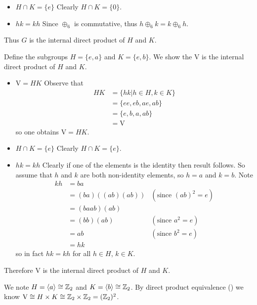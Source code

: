 \begin{questions}
\begin{itemize}
        \item $\boxed{H \cap K = \{e\}}$ Clearly $H \cap K = \{0\}$.

        \item $\boxed{hk = kh}$ Since $\oplus_6$ is commutative, thus $h \oplus_6 k = k \oplus_6 h$.
    \end{itemize}
    Thus $G$ is the internal direct product of $H$ and $K$.

    \item Define the subgroups $H = \{e, a\}$ and $K = \{e, b\}$. We show the $\mathrm{V}$ is the internal direct product of $H$ and $K$.
    \begin{itemize}
        \item $\boxed{\mathrm{V} = HK}$ Observe that
        \begin{align*}
            HK &= \{hk \vert h \in H, k \in K\}\\
            &= \{ee, eb, ae, ab\}\\
            &= \{e, b, a, ab\}\\
            &= \mathrm{V}
        \end{align*}
        so one obtains $\mathrm{V} = HK$.

        \item $\boxed{H \cap K = \{e\}}$ Clearly $H \cap K = \{e\}$.

        \item $\boxed{hk = kh}$ Clearly if one of the elements is the identity then result follows. So assume that $h$ and $k$ are both non-identity elements, so $h = a$ and $k = b$. Note
        \begin{align*}
            kh &= ba\\
            &= (ba)\left((ab)(ab)\right) & (\text{since }(ab)^2 = e)\\
            &= (ba ab)(ab)\\
            &= (bb)(ab) & (\text{since }a^2 = e)\\
            &= ab & (\text{since }b^2 = e)\\
            &= hk
        \end{align*}
        so in fact $hk = kh$ for all $h \in H$, $k \in K$.
    \end{itemize}
    Therefore $\mathrm{V}$ is the internal direct product of $H$ and $K$.

    We note $H = \langle a\rangle \cong \mathbb{Z}_2$ and $K = \langle b \rangle \cong \mathbb{Z}_2$. By direct product equivalence () we know $\mathrm{V} \cong H \times K \cong \mathbb{Z}_2 \times \mathbb{Z}_2 = (\mathbb{Z}_2)^2$.
\end{questions}
